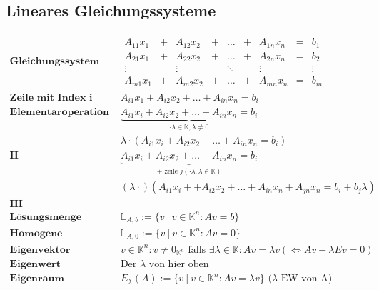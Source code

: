 \documentclass{article}
\begin{document}
		\subsection*{Lineares Gleichungssysteme}
			\begin{align*}
				\textbf{Gleichungssystem } & 
					\begin{matrix}
						A_{11}x_1 & + & A_{12}x_2 & + & \ldots & + & A_{1n}x_n & = & b_1\\
						A_{21}x_1 & + & A_{22}x_2 & + & \ldots & + & A_{2n}x_n & = & b_2\\ 
						\vdots & & \vdots & & \ddots & & \vdots && \vdots\\
						A_{m1}x_1 & + & A_{m2}x_2 & + & \ldots & + & A_{mn}x_n & = & b_m
					\end{matrix}\\
				\textbf{Zeile mit Index i } & A_{i1}x_1 + A_{i2}x_2 + \ldots + A_{in}x_n = b_i\\
				\textbf{Elementaroperation I } & \underbrace{A_{i1}x_i + A_{i2}x_2 + \ldots + A_{in}x_n = b_i}_{\cdot \lambda \in \mathbb{K}, \lambda \neq 0}\\
				& \lambda \cdot (A_{i1}x_i + A_{i2}x_2 + \ldots + A_{in}x_n = b_i)\\
				\textbf{II } & \underbrace{A_{i1}x_i + A_{i2}x_2 + \ldots + A_{in}x_n = b_i}_{ + \text{ zeile } j (\cdot \lambda, \lambda \in \mathbb{K})}\\
				& (\lambda \cdot) (A_{i1}x_i +  + A_{i2}x_2 + \ldots + A_{in}x_n + A_{jn}x_n = b_i + b_j\lambda)\\
				\textbf{III } & \\
				\textbf{L\"osungsmenge } & \mathbb{L}_{A, b} := \{v\ |\ v \in \mathbb{K}^n: Av = b\}\\
				\textbf{Homogene L\"osungsraum } & \mathbb{L}_{A, 0} := \{v\ |\ v \in \mathbb{K}^n: Av = 0\}\\
				\textbf{Eigenvektor } & v \in \mathbb{K}^n: v \neq 0_{\mathbb{K}^n} \text{ falls } \exists \lambda \in \mathbb{K}: Av = \lambda v (\Leftrightarrow Av - \lambda E v = 0)\\
				\textbf{Eigenwert } & \text{Der } \lambda \text{ von hier oben}\\
				\textbf{Eigenraum } & E_\lambda(A) := \{v\ |\ v \in \mathbb{K}^n: Av = \lambda v\} \text{ ($\lambda$ EW von A)}
			\end{align*}
\end{document}
